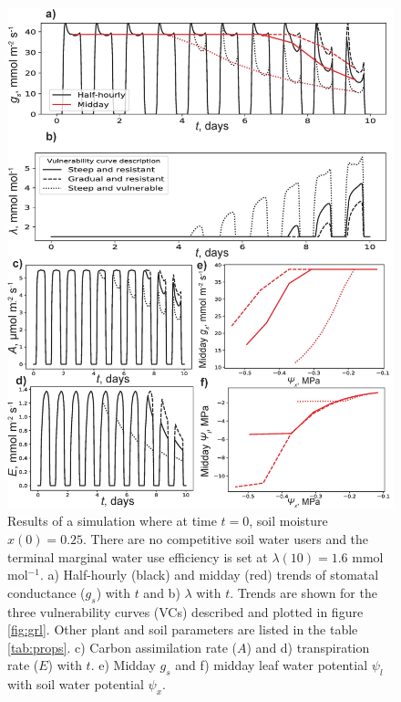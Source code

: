 \documentclass[utf8]{frontiersSCNS} %
\begin{document}
\begin{figure}[h]
    \begin{center}
         \includegraphics[scale=0.65]{WUS_no_comp.jpg} 
    \end{center}
    \caption{Results of a simulation where at time $t=0$, soil moisture $x(0) =0.25$. There are no competitive soil water users and the terminal marginal water use efficiency is set at $\lambda(10) = 1.6$ mmol mol$^{-1}$. a) Half-hourly (black) and midday (red) trends of stomatal conductance ($g_s$) with $t$ and b) $\lambda$ with $t$. Trends are shown for the three vulnerability curves (VCs) described and plotted in figure \ref{fig:grl}. Other plant and soil parameters are listed in the table \ref{tab:props}. c) Carbon assimilation rate ($A$) and d) transpiration rate ($E$) with $t$. e) Midday $g_s$ and f) midday leaf water potential $\psi_l$ with soil water potential $\psi_x$.}
    \label{fig:WUS_no_comp}
\end{figure}
\end{document}
